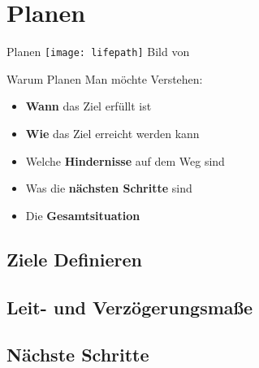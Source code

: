 \section{Planen}


\begin{frame}[c]{Planen}
    \normalsize
    \texttt{[image: lifepath]}
    Bild von \cite{lifepath-pic}
\end{frame}


\begin{frame}[c]{Warum Planen}
    Man möchte Verstehen:
    \begin{itemize}[<+(1)->]
        \item \textbf{Wann} das Ziel erfüllt ist
        \item \textbf{Wie} das Ziel erreicht werden kann
        \item Welche \textbf{Hindernisse} auf dem Weg sind
        \item Was die \textbf{nächsten Schritte} sind
        \item Die \textbf{Gesamtsituation}
    \end{itemize}
\end{frame}

\subsection{Ziele Definieren}


\subsection{Leit- und Verzögerungsmaße}


\subsection{Nächste Schritte}


